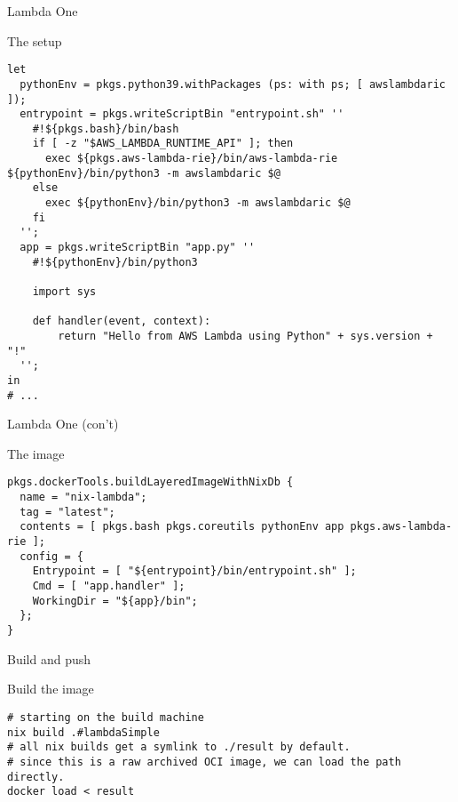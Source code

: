 \documentclass[bigger]{beamer}
\begin{document}
\begin{frame}[label={sec:org16aef04},fragile]{Lambda One}
 \begin{block}{The setup}
\tiny
\begin{verbatim}
let
  pythonEnv = pkgs.python39.withPackages (ps: with ps; [ awslambdaric ]);
  entrypoint = pkgs.writeScriptBin "entrypoint.sh" ''
    #!${pkgs.bash}/bin/bash
    if [ -z "$AWS_LAMBDA_RUNTIME_API" ]; then
      exec ${pkgs.aws-lambda-rie}/bin/aws-lambda-rie ${pythonEnv}/bin/python3 -m awslambdaric $@
    else
      exec ${pythonEnv}/bin/python3 -m awslambdaric $@
    fi
  '';
  app = pkgs.writeScriptBin "app.py" ''
    #!${pythonEnv}/bin/python3

    import sys

    def handler(event, context):
        return "Hello from AWS Lambda using Python" + sys.version + "!"
  '';
in
# ...
\end{verbatim}
\end{block}
\end{frame}
\begin{frame}[label={sec:org1a52a58},fragile]{Lambda One (con't)}
 \begin{block}{The image}
\tiny
\begin{verbatim}
pkgs.dockerTools.buildLayeredImageWithNixDb {
  name = "nix-lambda";
  tag = "latest";
  contents = [ pkgs.bash pkgs.coreutils pythonEnv app pkgs.aws-lambda-rie ];
  config = {
    Entrypoint = [ "${entrypoint}/bin/entrypoint.sh" ];
    Cmd = [ "app.handler" ];
    WorkingDir = "${app}/bin";
  };
}
\end{verbatim}
\end{block}
\end{frame}
\begin{frame}[label={sec:org749875c},fragile]{Build and push}
 \begin{exampleblock}{Build the image}
\tiny
\begin{verbatim}
# starting on the build machine
nix build .#lambdaSimple
# all nix builds get a symlink to ./result by default.
# since this is a raw archived OCI image, we can load the path directly.
docker load < result
\end{verbatim}
\end{exampleblock}
\end{frame}
\end{document}
